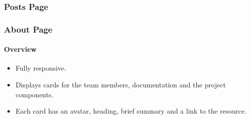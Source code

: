 \subsubsection{Posts Page}
\subsubsection{About Page}
\paragraph{Overview\newline}
\begin{itemize}
    \item Fully responsive.
    \item Displays cards for the team members, documentation and the project components.
    \item Each card has an avatar, heading, brief summary and a link to the resource.
\end{itemize}

